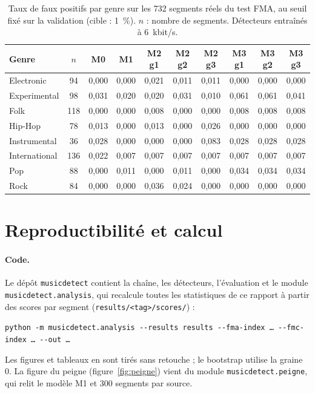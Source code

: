 \documentclass[a4paper, 11pt]{article}
\begin{document}
\begin{table}[H]
    \centering
    \small
    \begin{tabular}{lccccccccc}
        \toprule
        Genre & $n$ & M0 & M1 & M2 g1 & M2 g2 & M2 g3 & M3 g1 & M3 g2 & M3 g3 \\
        \midrule
        Electronic    & 94  & 0,000 & 0,000 & 0,021 & 0,011 & 0,011 & 0,000 & 0,000 & 0,000 \\
        Experimental  & 98  & 0,031 & 0,020 & 0,020 & 0,031 & 0,010 & 0,061 & 0,061 & 0,041 \\
        Folk          & 118 & 0,000 & 0,000 & 0,008 & 0,000 & 0,000 & 0,008 & 0,008 & 0,008 \\
        Hip-Hop       & 78  & 0,013 & 0,000 & 0,013 & 0,000 & 0,026 & 0,000 & 0,000 & 0,000 \\
        Instrumental  & 36  & 0,028 & 0,000 & 0,000 & 0,000 & 0,083 & 0,028 & 0,028 & 0,028 \\
        International & 136 & 0,022 & 0,007 & 0,007 & 0,007 & 0,007 & 0,007 & 0,007 & 0,007 \\
        Pop           & 88  & 0,000 & 0,011 & 0,000 & 0,011 & 0,000 & 0,034 & 0,034 & 0,034 \\
        Rock          & 84  & 0,000 & 0,000 & 0,036 & 0,024 & 0,000 & 0,000 & 0,000 & 0,000 \\
        \bottomrule
    \end{tabular}
    \caption{Taux de faux positifs par genre sur les 732 segments réels du test FMA, au seuil fixé sur la
    validation (cible : 1~\%). $n$ : nombre de segments. Détecteurs entraînés à 6~kbit/s.}
\end{table}

\section{Reproductibilité et calcul}
\label{app:repro}

\paragraph{Code.} Le dépôt \texttt{musicdetect} contient la chaîne, les détecteurs, l'évaluation et le
module \texttt{musicdetect.analysis}, qui recalcule toutes les statistiques de ce rapport à partir des scores
par segment (\texttt{results/<tag>/scores/}) :
\begin{center}
\footnotesize\texttt{python -m musicdetect.analysis -{}-results results -{}-fma-index \dots{} -{}-fmc-index \dots{} -{}-out \dots}
\end{center}
Les figures et tableaux en sont tirés sans retouche ; le bootstrap utilise la graine 0. La figure du
peigne (figure~\ref{fig:peigne}) vient du module \texttt{musicdetect.peigne}, qui relit le modèle M1 et
300 segments par source.
\end{document}
